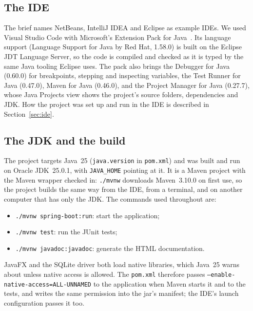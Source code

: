 \subsection{The IDE}

The brief names NetBeans, IntelliJ IDEA and Eclipse as example IDEs. We used Visual Studio Code with Microsoft's
Extension Pack for Java~\cite{vscode-java}. Its language support (Language Support for Java by Red Hat, 1.58.0) is
built on the Eclipse JDT Language Server, so the code is compiled and checked as it is typed by the same Java tooling
Eclipse uses. The pack also brings the Debugger for Java (0.60.0) for breakpoints, stepping and inspecting variables,
the Test Runner for Java (0.47.0), Maven for Java (0.46.0), and the Project Manager for Java (0.27.7), whose Java
Projects view shows the project's source folders, dependencies and JDK. How the project was set up and run
in the IDE is described in Section~\ref{sec:ide}.

\subsection{The JDK and the build}

The project targets Java~25 (\texttt{java.version} in \texttt{pom.xml}) and was built and run on Oracle JDK~25.0.1,
with \texttt{JAVA\_HOME} pointing at it. It is a Maven project with the Maven wrapper checked in: \texttt{./mvnw}
downloads Maven~3.10.0 on first use, so the project builds the same way from the IDE, from a terminal, and on another
computer that has only the JDK. The commands used throughout are:
\begin{itemize}
  \item \texttt{./mvnw spring-boot:run}: start the application;
  \item \texttt{./mvnw test}: run the JUnit tests;
  \item \texttt{./mvnw javadoc:javadoc}: generate the HTML documentation.
\end{itemize}
JavaFX and the SQLite driver both load native libraries, which Java~25 warns about unless native access is allowed.
The \texttt{pom.xml} therefore passes \texttt{--enable-native-access=ALL-UNNAMED} to the application when Maven starts
it and to the tests, and writes the same permission into the jar's manifest; the IDE's launch configuration passes
it too.

